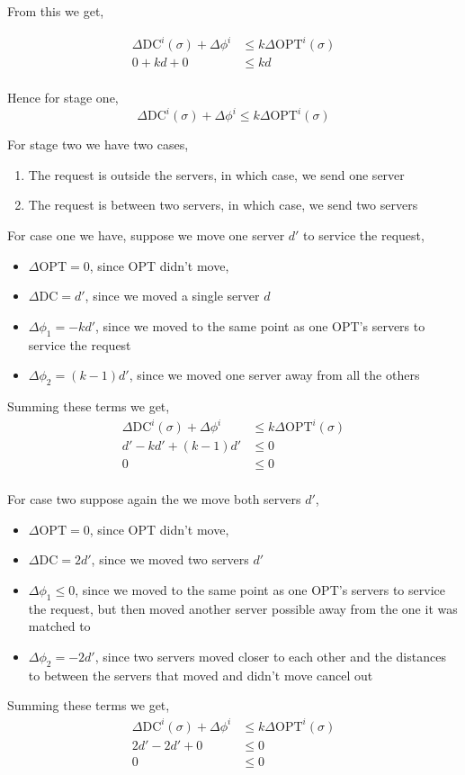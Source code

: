 \documentclass[11pt]{article}
\newcommand{\DC}{\text{DC}}
\newcommand{\OPT}{\text{OPT}}
\begin{document}
From this we get, 

\begin{align*}
	\Delta\DC^i(\sigma) + \Delta\phi^{i} &\leq k \Delta\OPT^i(\sigma)\\
	0 + kd  + 0 &\leq kd\\
\end{align*}

Hence for stage one, 
$$
\Delta\DC^i(\sigma) + \Delta\phi^{i} \leq k \Delta\OPT^i(\sigma)
$$

For stage two we have two cases, 
\begin{enumerate}
		\item The request is outside the servers, in which case, we send one server 
		\item The request is between two servers, in which case, we send two servers
\end{enumerate}

For case one we have, suppose we move one server $d'$ to service the request,  

\begin{itemize}
		\item $\Delta\OPT = 0$, since OPT didn't move, 
		\item $\Delta\DC = d'$, since we moved a single server $d$
		\item $\Delta\phi_1 = -kd'$, since we moved to the same point as one OPT's servers to service the request
		\item $\Delta\phi_2 = (k-1)d'$, since we moved one server away from all the others
\end{itemize}

Summing these terms we get,
\begin{align*}
	\Delta\DC^i(\sigma) + \Delta\phi^{i} &\leq k \Delta\OPT^i(\sigma)\\
	d' - kd'  + (k-1)d' &\leq 0\\
	0 &\leq 0\\
\end{align*}

For case two suppose again the we move both servers $d'$, 

\begin{itemize}
		\item $\Delta\OPT = 0$, since OPT didn't move, 
		\item $\Delta\DC = 2d'$, since we moved two servers $d'$
		\item $\Delta\phi_1 \leq 0$, since we moved to the same point as one OPT's servers to service the request, but then moved another server possible away from the one it was matched to
		\item $\Delta\phi_2 = -2d'$, since two servers moved closer to each other and the distances to between the servers that moved and didn't move cancel out
\end{itemize}
Summing these terms we get,
\begin{align*}
	\Delta\DC^i(\sigma) + \Delta\phi^{i} &\leq k \Delta\OPT^i(\sigma)\\
	2d' - 2d'  + 0 &\leq 0\\
	0 &\leq 0\\
\end{align*}
\end{document}
